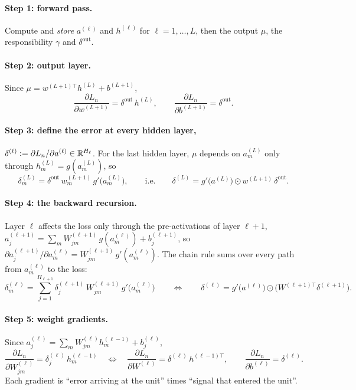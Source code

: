\paragraph{Step 1: forward pass.} Compute and \emph{store} $a^{(\ell)}$ and $h^{(\ell)}$ for $\ell=1,\dots,L$, then the output $\mu$, the responsibility $\gamma$ and $\delta^{\text{out}}$.

\paragraph{Step 2: output layer.} Since $\mu=w^{(L+1)\top}h^{(L)}+b^{(L+1)}$,
\begin{equation}
\frac{\partial L_n}{\partial w^{(L+1)}}=\delta^{\text{out}}\,h^{(L)},\qquad \frac{\partial L_n}{\partial b^{(L+1)}}=\delta^{\text{out}}.
\end{equation}

\paragraph{Step 3: define the error at every hidden layer,} $\delta^{(\ell)}:=\partial L_n/\partial a^{(\ell)}\in\mathbb{R}^{H_\ell}$. For the last hidden layer, $\mu$ depends on $a^{(L)}_m$ only through $h^{(L)}_m=g(a^{(L)}_m)$, so
\begin{equation}
\delta^{(L)}_m=\delta^{\text{out}}\,w^{(L+1)}_m\,g'\big(a^{(L)}_m\big),\qquad\text{i.e.}\qquad\delta^{(L)}=g'\big(a^{(L)}\big)\odot w^{(L+1)}\,\delta^{\text{out}}.
\end{equation}

\paragraph{Step 4: the backward recursion.} Layer $\ell$ affects the loss only through the pre-activations of layer $\ell+1$, $a^{(\ell+1)}_j=\sum_mW^{(\ell+1)}_{jm}\,g(a^{(\ell)}_m)+b^{(\ell+1)}_j$, so $\partial a^{(\ell+1)}_j/\partial a^{(\ell)}_m=W^{(\ell+1)}_{jm}\,g'(a^{(\ell)}_m)$. The chain rule sums over every path from $a^{(\ell)}_m$ to the loss:
\begin{equation}
\delta^{(\ell)}_m=\sum_{j=1}^{H_{\ell+1}}\delta^{(\ell+1)}_j\,W^{(\ell+1)}_{jm}\,g'\big(a^{(\ell)}_m\big)\qquad\Longleftrightarrow\qquad\delta^{(\ell)}=g'\big(a^{(\ell)}\big)\odot\Big(W^{(\ell+1)\top}\delta^{(\ell+1)}\Big).
\end{equation}

\paragraph{Step 5: weight gradients.} Since $a^{(\ell)}_j=\sum_mW^{(\ell)}_{jm}h^{(\ell-1)}_m+b^{(\ell)}_j$,
\begin{equation}
\frac{\partial L_n}{\partial W^{(\ell)}_{jm}}=\delta^{(\ell)}_j\,h^{(\ell-1)}_m\quad\Longleftrightarrow\quad\frac{\partial L_n}{\partial W^{(\ell)}}=\delta^{(\ell)}\,h^{(\ell-1)\top},\qquad\frac{\partial L_n}{\partial b^{(\ell)}}=\delta^{(\ell)}.
\end{equation}
Each gradient is ``error arriving at the unit'' times ``signal that entered the unit''.

